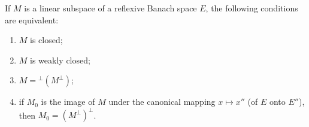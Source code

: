 If $M$ is a linear subspace of a reflexive Banach space $E$, the following conditions are equivalent:
\begin{enumerate}
\item[(a)] $M$ is closed;
\item[(b)] $M$ is weakly closed;
\item[(c)] $M = {}^\perp(M^\perp)$;
\item[(d)] if $M_0$ is the image of $M$ under the canonical mapping $x \mapsto x''$ (of $E$ onto $E''$), then $M_0 = (M^\perp)^\perp$.
\end{enumerate}
